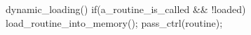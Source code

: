 \documentclass[varwidth=19em,crop]{standalone}
\begin{document}
\begin{ccode}
dynamic_loading(){
  if(a_routine_is_called && !loaded){
    load_routine_into_memory();
  }
  pass_ctrl(routine);
}  
\end{ccode}
\end{document}
